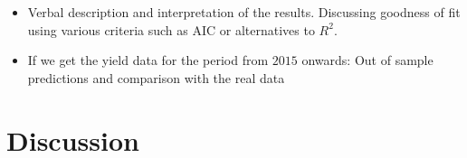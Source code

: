 \documentclass[a4paper,12pt]{article}
\begin{document}
\begin{itemize}
\pagebreak

\color{blue}




	
\item Verbal description and interpretation of the results. Discussing goodness of fit using various criteria such as AIC or alternatives to $R^2$.

	
\item If we get the yield data for the period from $2015$ onwards: Out of sample predictions and comparison with the real data
\end{itemize}


\color{black}
\section{Discussion}\label{Discussion}

\color{red}
		
\end{document}
